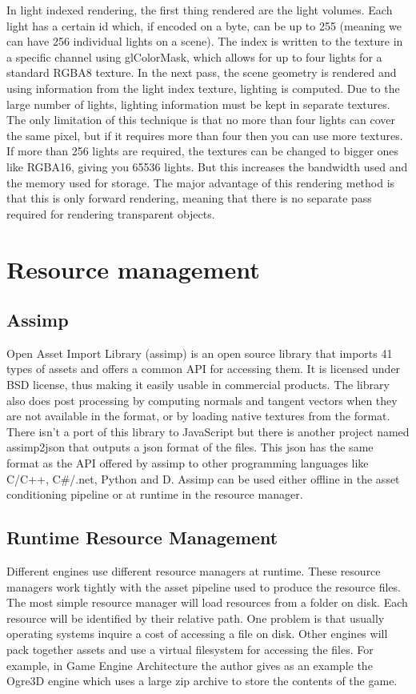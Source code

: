 In light indexed rendering, the first thing rendered are the light volumes. Each light has a certain id which, if encoded on a byte, can be up to 255 (meaning we can have 256 individual lights on a scene). The index is written to the texture in a specific channel using glColorMask, which allows for up to four lights for a standard RGBA8 texture.
In the next pass, the scene geometry is rendered and using information from the light index texture, lighting is computed.
Due to the large number of lights, lighting information must be kept in separate textures.
The only limitation of this technique is that no more than four lights can cover the same pixel, but if it requires more than four then you can use more textures. If more than 256 lights are required, the textures can be changed to bigger ones like RGBA16, giving you 65536 lights. But this increases the bandwidth used and the memory used for storage.
The major advantage of this rendering method is that this is only forward rendering, meaning that there is no separate pass required for rendering transparent objects.

\section{Resource management}

\subsection{Assimp}

Open Asset Import Library (assimp) is an open source library that imports 41 types of assets and offers a common API for accessing them. It is licensed under BSD license, thus making it easily usable in commercial products. The library also does post processing by computing normals and tangent vectors when they are not available in the format, or by loading native textures from the format. There isn’t a port of this library to JavaScript but there is another project named assimp2json that outputs a json format of the files. This json has the same format as the API offered by assimp to other programming languages like C/C++, C\#/.net, Python and D.  Assimp can be used either offline in the asset conditioning pipeline or at runtime in the resource manager.

\subsection{Runtime Resource Management}

Different engines use different resource managers at runtime. These resource managers work tightly with the asset pipeline used to produce the resource files.
The most simple resource manager will load resources from a folder on disk. Each resource will be identified by their relative path. One problem is that usually operating systems inquire a cost of accessing a file on disk. Other engines will pack together assets and use a virtual filesystem for accessing the files. For example, in Game Engine Architecture the author gives as an example the Ogre3D engine which uses a large zip archive to store the contents of the game.





